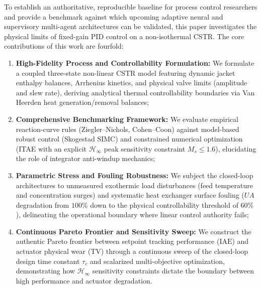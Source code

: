 To establish an authoritative, reproducible baseline for process control researchers and provide a benchmark against which upcoming adaptive neural and supervisory multi-agent architectures can be validated, this paper investigates the physical limits of fixed-gain PID control on a non-isothermal CSTR. The core contributions of this work are fourfold:
\begin{enumerate}
    \item \textbf{High-Fidelity Process and Controllability Formulation:} We formulate a coupled three-state non-linear CSTR model featuring dynamic jacket enthalpy balances, Arrhenius kinetics, and physical valve limits (amplitude and slew rate), deriving analytical thermal controllability boundaries via Van Heerden heat generation/removal balances;
    \item \textbf{Comprehensive Benchmarking Framework:} We evaluate empirical reaction-curve rules (Ziegler--Nichols, Cohen--Coon) against model-based robust control (Skogestad SIMC) and constrained numerical optimization (ITAE with an explicit $\mathcal{H}_\infty$ peak sensitivity constraint $M_s \le 1.6$), elucidating the role of integrator anti-windup mechanics;
    \item \textbf{Parametric Stress and Fouling Robustness:} We subject the closed-loop architectures to unmeasured exothermic load disturbances (feed temperature and concentration surges) and systematic heat exchanger surface fouling ($UA$ degradation from $100\%$ down to the physical controllability threshold of $60\%$), delineating the operational boundary where linear control authority fails;
    \item \textbf{Continuous Pareto Frontier and Sensitivity Sweep:} We construct the authentic Pareto frontier between setpoint tracking performance ($\text{IAE}$) and actuator physical wear ($\text{TV}$) through a continuous sweep of the closed-loop design time constant $\tau_c$ and scalarized multi-objective optimization, demonstrating how $\mathcal{H}_\infty$ sensitivity constraints dictate the boundary between high performance and actuator degradation.
\end{enumerate}
